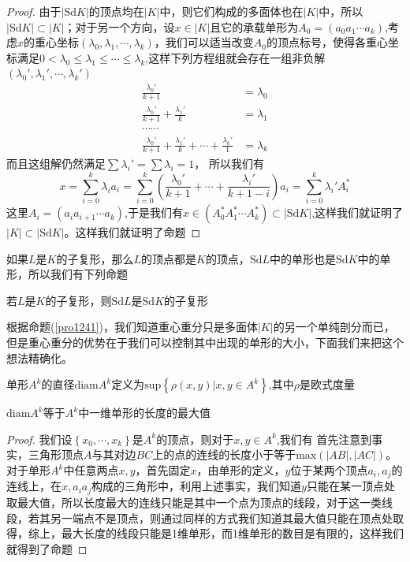 \begin{proof}
由于$|\text{Sd}K|$的顶点均在$|K|$中，则它们构成的多面体也在$|K|$中，所以$|\text{Sd}K|\subset |K|$；对于另一个方向，设$x\in|K|$且它的承载单形为$A_{0}=(a_{0}a_{1}\cdots a_{k})$,考虑$x$的重心坐标$(\lambda_{0},\lambda_{1},\cdots,\lambda_{k})$，我们可以适当改变$A_{0}$的顶点标号，使得各重心坐标满足$0<\lambda_{0}\leq \lambda_{1}\leq\cdots\leq\lambda_{k}$,这样下列方程组就会存在一组非负解$(\lambda_{0}',\lambda_{1}',\cdots,\lambda_{k}')$
\begin{equation*}
    \begin{aligned}
     \frac{\lambda_{0}'}{k+1}&=\lambda_{0}\\
     \frac{\lambda_{0}'}{k+1}+\frac{\lambda_{1}'}{k}&=\lambda_{1}\\
     \cdots \cdots\\
     \frac{\lambda_{0}'}{k+1}+\frac{\lambda_{1}'}{k}+\cdots+\frac{\lambda_{k}'}{1}&=\lambda_{k}
    \end{aligned}
\end{equation*}
而且这组解仍然满足$\sum\lambda_{i}'=\sum\lambda_{i}=1$，
所以我们有
\begin{equation*}
    x=\sum\limits_{i=0}^{k}\lambda_{i}a_{i}=\sum\limits_{i=0}^{k}\left(\frac{\lambda_{0}'}{k+1}+\cdots+\frac{\lambda_{i}'}{k+1-i}\right)a_{i}=\sum\limits_{i=0}^{k}\lambda_{i}'A^{*}_{i}
\end{equation*}
这里$A_{i}=(a_{i}a_{i+1}\cdots a_{k})$,于是我们有$x\in (A_{0}^{*}A^{*}_{1}\cdots A^{*}_{k})\subset |\text{Sd}K|$,这样我们就证明了$|K|\subset|\text{Sd}K|$。这样我们就证明了命题
\end{proof}
如果$L$是$K$的子复形，那么$L$的顶点都是$K$的顶点，$\text{Sd}L$中的单形也是$\text{Sd}K$中的单形，所以我们有下列命题
\begin{proposition}
若$L$是$K$的子复形，则$\text{Sd}L$是$\text{Sd}K$的子复形
\end{proposition}
根据命题(\ref{pro1241})，我们知道重心重分只是多面体$|K|$的另一个单纯剖分而已，但是重心重分的优势在于我们可以控制其中出现的单形的大小，下面我们来把这个想法精确化。
\begin{definition}
单形$A^{k}$的直径$\text{diam}A^{k}$定义为$\text{sup}\left\{\rho(x,y)|x,y\in A^{k}\right\}$,其中$\rho$是欧式度量
\end{definition}
\begin{proposition}
$\text{diam}A^{k}$等于$A^{k}$中一维单形的长度的最大值
\end{proposition}
\begin{proof}
我们设$\left\{x_{0},\cdots,x_{k}\right\}$是$A^{k}$的顶点，则对于$x,y\in A^{k}$,我们有
首先注意到事实，三角形顶点$A$与其对边$BC$上的点的连线的长度小于等于$\text{max}(|AB|,|AC|)$。对于单形$A^{k}$中任意两点$x,y$，首先固定$x$，由单形的定义，$y$位于某两个顶点$a_{i},a_{j}$的连线上，在$x,a_{i}a_{j}$构成的三角形中，利用上述事实，我们知道$y$只能在某一顶点处取最大值，所以长度最大的连线只能是其中一个点为顶点的线段，对于这一类线段，若其另一端点不是顶点，则通过同样的方式我们知道其最大值只能在顶点处取得，综上，最大长度的线段只能是1维单形，而1维单形的数目是有限的，这样我们就得到了命题
\end{proof}
